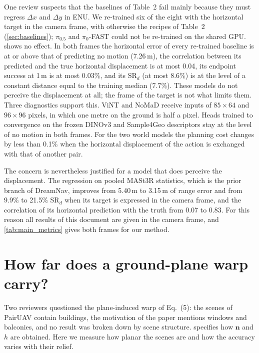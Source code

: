 \documentclass[10pt,twocolumn,letterpaper]{article}
\newcommand{\SRd}{SR$_{d}$}
\begin{document}
One review suspects that the baselines of Table~2 fail mainly because they must regress $\Delta x$ and $\Delta y$ in ENU. We re-trained six of the eight with the horizontal target in the camera frame, with otherwise the recipes of Table~2 (\cref{sec:baselines}); $\pi_{0.5}$ and $\pi_0$-FAST could not be re-trained on the shared GPU.  shows no effect. In both frames the horizontal error of every re-trained baseline is at or above that of predicting no motion (7.26\,m), the correlation between its predicted and the true horizontal displacement is at most 0.04, its endpoint success at 1\,m is at most 0.03\%, and its \SRd{} (at most 8.6\%) is at the level of a constant distance equal to the training median (7.7\%). These models do not perceive the displacement at all; the frame of the target is not what limits them. Three diagnostics support this. ViNT and NoMaD receive inputs of $85{\times}64$ and $96{\times}96$ pixels, in which one metre on the ground is half a pixel. Heads trained to convergence on the frozen DINOv3 and Sample4Geo descriptors stay at the level of no motion in both frames. For the two world models the planning cost changes by less than 0.1\% when the horizontal displacement of the action is exchanged with that of another pair.

The concern is nevertheless justified for a model that does perceive the displacement. The regression on pooled MASt3R statistics, which is the prior branch of DreamNav, improves from 5.40\,m to 3.15\,m of range error and from 9.9\% to 21.5\% \SRd{} when its target is expressed in the camera frame, and the correlation of its horizontal prediction with the truth from 0.07 to 0.83. For this reason all results of this document are given in the camera frame, and \cref{tab:main_metrics} gives both frames for our method.

\section{How far does a ground-plane warp carry?}
\label{sec:planarity}

Two reviewers questioned the plane-induced warp of Eq.~(5): the scenes of PairUAV contain buildings, the motivation of the paper mentions windows and balconies, and no result was broken down by scene structure.  specifies how $\mathbf{n}$ and $h$ are obtained. Here we measure how planar the scenes are and how the accuracy varies with their relief.
\end{document}
